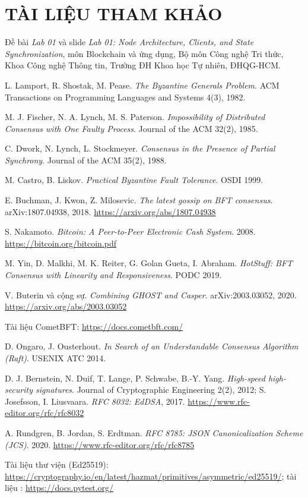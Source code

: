 \documentclass[a4paper,12pt]{article}
\newcommand{\code}[1]{\texttt{\detokenize{#1}}}
\begin{document}
\section*{TÀI LIỆU THAM KHẢO}
\begin{enumerate}[label={[\arabic*]},leftmargin=2.2em]
\item Đề bài \emph{Lab 01} và slide \emph{Lab 01: Node Architecture, Clients, and State Synchronization},
môn Blockchain và ứng dụng, Bộ môn Công nghệ Tri thức, Khoa Công nghệ Thông tin, Trường ĐH Khoa học Tự nhiên, ĐHQG-HCM.
\item L. Lamport, R. Shostak, M. Pease. \emph{The Byzantine Generals Problem}. ACM Transactions on Programming Languages and Systems 4(3), 1982.
\item M. J. Fischer, N. A. Lynch, M. S. Paterson. \emph{Impossibility of Distributed Consensus with One Faulty Process}. Journal of the ACM 32(2), 1985.
\item C. Dwork, N. Lynch, L. Stockmeyer. \emph{Consensus in the Presence of Partial Synchrony}. Journal of the ACM 35(2), 1988.
\item M. Castro, B. Liskov. \emph{Practical Byzantine Fault Tolerance}. OSDI 1999.
\item E. Buchman, J. Kwon, Z. Milosevic. \emph{The latest gossip on BFT consensus}. arXiv:1807.04938, 2018. \url{https://arxiv.org/abs/1807.04938}
\item S. Nakamoto. \emph{Bitcoin: A Peer-to-Peer Electronic Cash System}. 2008. \url{https://bitcoin.org/bitcoin.pdf}
\item M. Yin, D. Malkhi, M. K. Reiter, G. Golan Gueta, I. Abraham. \emph{HotStuff: BFT Consensus with Linearity and Responsiveness}. PODC 2019.
\item V. Buterin và cộng sự. \emph{Combining GHOST and Casper}. arXiv:2003.03052, 2020. \url{https://arxiv.org/abs/2003.03052}
\item Tài liệu CometBFT: \url{https://docs.cometbft.com/}
\item D. Ongaro, J. Ousterhout. \emph{In Search of an Understandable Consensus Algorithm (Raft)}. USENIX ATC 2014.
\item D. J. Bernstein, N. Duif, T. Lange, P. Schwabe, B.-Y. Yang. \emph{High-speed high-security signatures}. Journal of Cryptographic Engineering 2(2), 2012; S. Josefsson, I. Liusvaara. \emph{RFC 8032: EdDSA}, 2017. \url{https://www.rfc-editor.org/rfc/rfc8032}
\item A. Rundgren, B. Jordan, S. Erdtman. \emph{RFC 8785: JSON Canonicalization Scheme (JCS)}. 2020. \url{https://www.rfc-editor.org/rfc/rfc8785}
\item Tài liệu thư viện \code{cryptography} (Ed25519): \url{https://cryptography.io/en/latest/hazmat/primitives/asymmetric/ed25519/}; tài liệu \code{pytest}: \url{https://docs.pytest.org/}
\end{enumerate}
\end{document}
